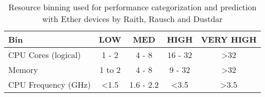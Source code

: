 \begin{table}[]
\begin{tabular}{lcccc}
\hline
\textbf{Bin}        & \textbf{LOW}  & \textbf{MED} & \textbf{HIGH} & \textbf{VERY HIGH} \\ \hline
CPU Cores (logical) & 1 - 2         & 4 - 8        & 16 - 32       & \textgreater 32    \\
Memory              & 1 to 2        & 4 - 8        & 9 - 32        & \textgreater 32    \\
CPU Frequency (GHz) & \textless 1.5 & 1.6 - 2.2    & \textless 3.5 & \textgreater 3.5   \\ \hline
\end{tabular}
\caption{Resource binning used for performance categorization and prediction with Ether devices by Raith, Rausch and Dustdar\cite{philipp-da}}
\label{tab:ether_bins}
\end{table}

